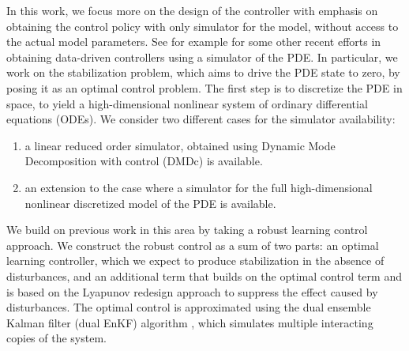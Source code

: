 \documentclass[10pt,a4paper]{amsart}
\begin{document}
In this work, we focus more on the design of the controller with emphasis on obtaining the control policy with only simulator for the model, without access to the actual model parameters. See for example \cite{duriez2017machine,blanchard2021bayesian,fan2020reinforcement, Garnieretal21} for some other recent efforts in obtaining data-driven controllers using a simulator of the PDE.   
In particular, we work on the stabilization problem, which aims to drive the PDE state to zero, by posing it as an optimal control problem. The first step is to discretize the PDE in space, to yield a high-dimensional nonlinear system of ordinary differential equations (ODEs). We consider two different cases for the simulator availability: 
\begin{enumerate}
    \item a linear reduced order simulator, obtained using Dynamic Mode Decomposition with control (DMDc) \cite{proctor2016dynamic,zhang-2024} is available.
    \item an extension to the case where a simulator for the full high-dimensional nonlinear discretized model of the PDE is available.
\end{enumerate}

We build on previous work in this area \cite{zhang-2024}  by taking a robust learning control approach. We construct the robust control as a sum of two parts: an optimal learning controller, which we expect to produce stabilization in the absence of disturbances, and an additional term that builds on the optimal control term and is based on the Lyapunov redesign approach \cite{khalil} to suppress the effect caused by disturbances. 
The optimal control is approximated using the dual ensemble Kalman filter (dual EnKF) algorithm \cite{joshi-2022}, which simulates multiple interacting copies of the system.
\end{document}
